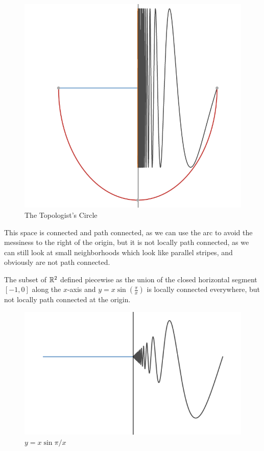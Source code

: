 {	\begin{figure}[!htb]
		\centering
		\includegraphics[scale=.3]{images/topcirc}
		\caption{The Topologist's Circle}
		\label{fig:topcirc}
	\end{figure}
	
	This space is connected and path connected, as we can use the arc to avoid the messiness to the right of the origin, but it is not locally path connected, as we can still look at small neighborhoods which look like parallel stripes, and obviously are not path connected.



The subset of $\mathbb{R}^2$ defined piecewise as the union of the closed horizontal segment $[-1,0]$ along the $x$-axis and $y=x\sin(\frac{\pi}{x})$ is locally connected everywhere, but not locally path connected at the origin.


	
	\begin{figure}[!htb]
		\centering
		\includegraphics[scale=.3]{images/xsinx}
		\caption{$y=x\sin{\pi/x}$}
		\label{fig:xsinx}
	\end{figure}

}

